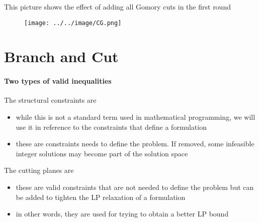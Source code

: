                     This picture shows the effect of adding all Gomory cuts in the first round
                    \begin{figure}[!h]
                        \centering
                        \texttt{[image: ../../image/CG.png]}
                    \end{figure}

        \section{Branch and Cut}
            \paragraph{Two types of valid inequalities}
                The structural constraints are 
                \begin{itemize}
                    \item while this is not a standard term used in mathematical programming, we will use it in reference to the constraints that define a formulation
                    \item these are constraints needs to define the problem. If removed, some infeasible integer solutions may become part of the solution space
                \end{itemize}

                The cutting planes are
                \begin{itemize}
                    \item these are valid constraints that are not needed to define the problem but can be added to tighten the LP relaxation of a formulation
                    \item in other words, they are used for trying to obtain a better LP bound
                \end{itemize}

